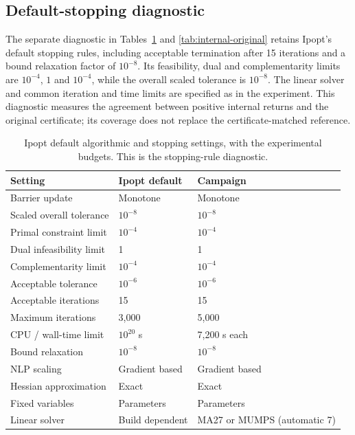 \documentclass[pdflatex,sn-mathphys-num]{sn-jnl}
\theoremstyle{thmstyleone}
\theoremstyle{thmstylethree}
\newcounter{algorithm}
\begin{document}
\FloatBarrier

\subsection{Default-stopping diagnostic}
The separate diagnostic in Tables~\ref{tab:reference-settings} and
\ref{tab:internal-original} retains Ipopt's default stopping rules,
including acceptable termination after 15 iterations and a bound
relaxation factor of $10^{-8}$. Its feasibility, dual and complementarity
limits are $10^{-4}$, $1$ and $10^{-4}$, while the overall scaled tolerance
is $10^{-8}$. The linear solver and common iteration and time limits
are specified as in the experiment. This diagnostic measures the agreement
between positive internal returns and the original certificate; its
coverage does not replace the certificate-matched reference.

\begin{table}[!htbp]
\centering\small
\caption{Ipopt default algorithmic and stopping settings, with the
experimental budgets. This is the stopping-rule diagnostic.}
\label{tab:reference-settings}

\begin{tabular}{lll}
\toprule
Setting & Ipopt default & Campaign \\
\midrule
Barrier update & Monotone & Monotone \\
Scaled overall tolerance & $10^{-8}$ & $10^{-8}$ \\
Primal constraint limit & $10^{-4}$ & $10^{-4}$ \\
Dual infeasibility limit & 1 & 1 \\
Complementarity limit & $10^{-4}$ & $10^{-4}$ \\
Acceptable tolerance & $10^{-6}$ & $10^{-6}$ \\
Acceptable iterations & 15 & 15 \\
Maximum iterations & 3,000 & 5,000 \\
CPU / wall-time limit & $10^{20}$ s & 7,200 s each \\
Bound relaxation & $10^{-8}$ & $10^{-8}$ \\
NLP scaling & Gradient based & Gradient based \\
Hessian approximation & Exact & Exact \\
Fixed variables & Parameters & Parameters \\
Linear solver & Build dependent & MA27 or MUMPS (automatic 7) \\
\bottomrule
\end{tabular}


\end{table}
\end{document}
